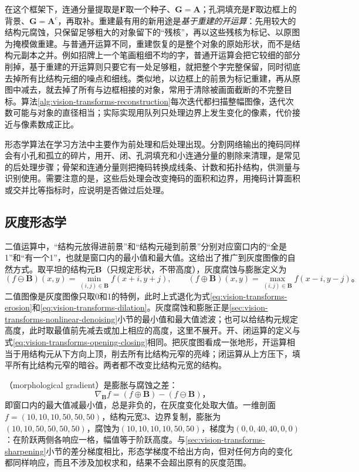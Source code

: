 在这个框架下，连通分量提取是$\bm{F}$取一个种子、$\bm{G}=\bm{A}$；孔洞填充是$\bm{F}$取边框上的背景、$\bm{G}=\bm{A}^{c}$，再取补。重建最有用的新用途是\emph{基于重建的开运算}：先用较大的结构元腐蚀，只保留足够粗大的对象留下的“残核”，再以这些残核为标记、以原图为掩模做重建。与普通开运算不同，重建恢复的是整个对象的原始形状，而不是结构元副本之并。例如招牌上一个笔画粗细不均的字，普通开运算会把它较细的部分削掉，基于重建的开运算则只要它有一处足够粗，就把整个字完整保留，同时彻底去掉所有比结构元细的噪点和细线。类似地，以边框上的前景为标记重建，再从原图中减去，就去掉了所有与边框相接的对象，常用于清除被画面截断的不完整目标。算法\ref{alg:vision-transforms-reconstruction}每次迭代都扫描整幅图像，迭代次数可能与对象的直径相当；实际实现用队列只处理边界上发生变化的像素，代价接近与像素数成正比。

形态学算法在学习方法中主要作为前处理和后处理出现。分割网络输出的掩码同样会有小孔和孤立的碎片，用开、闭、孔洞填充和小连通分量的剔除来清理，是常见的后处理步骤；骨架和连通分量则把掩码转换成线条、计数和拓扑结构，供测量与识别使用。需要注意的是，这些后处理会改变掩码的面积和边界，用掩码计算面积或交并比等指标时，应说明是否做过后处理。

\subsection{灰度形态学}
\label{sec:vision-transforms-grayscale-morphology}

二值运算中，“结构元放得进前景”和“结构元碰到前景”分别对应窗口内的“全是1”和“有一个1”，也就是窗口内的最小值和最大值。这给出了推广到灰度图像的自然方式。取平坦的结构元$\bm{B}$（只规定形状，不带高度），灰度腐蚀与膨胀定义为
\begin{equation}
  (f\ominus\bm{B})(x,y)=\min_{(i,j)\in\bm{B}}f(x+i,y+j),\qquad
  (f\oplus\bm{B})(x,y)=\max_{(i,j)\in\bm{B}}f(x-i,y-j)\text{。}
  \label{eq:vision-transforms-grayscale-morphology}
\end{equation}
二值图像是灰度图像只取0和1的特例，此时上式退化为式\eqref{eq:vision-transforms-erosion}和\eqref{eq:vision-transforms-dilation}。灰度腐蚀和膨胀正是\ref{sec:vision-transforms-nonlinear-denoising}小节的最小值和最大值滤波；也可以给结构元规定高度，此时取最值前先减去或加上相应的高度，这里不展开。开、闭运算的定义与式\eqref{eq:vision-transforms-opening-closing}相同。把灰度图看成一张地形，开运算相当于用结构元从下方向上顶，削去所有比结构元窄的亮峰；闭运算从上方压下，填平所有比结构元窄的暗谷。两者都不改变比结构元宽的结构。

（morphological gradient）是膨胀与腐蚀之差：
\begin{equation}
  \nabla_{\bm{B}}f=(f\oplus\bm{B})-(f\ominus\bm{B})\text{，}
  \label{eq:vision-transforms-morphological-gradient}
\end{equation}
即窗口内的最大值减最小值，总是非负的，在灰度变化处取大值。一维剖面$f=(10,10,10,50,50,50)$，结构元宽3、边界复制，膨胀为$(10,10,50,50,50,50)$，腐蚀为$(10,10,10,10,50,50)$，梯度为$(0,0,40,40,0,0)$：在阶跃两侧各响应一格，幅值等于阶跃高度。与\ref{sec:vision-transforms-sharpening}小节的差分梯度相比，形态学梯度不给出方向，但对任何方向的变化都同样响应，而且不涉及加权求和，结果不会超出原有的灰度范围。

